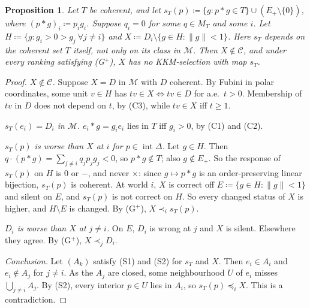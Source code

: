 \documentclass[11pt]{article}
\newcommand{\chg}[1]{{\color{red}#1}}
\newtheorem{proposition}[theorem]{Proposition}
\theoremstyle{definition}
\theoremstyle{remark}
\newcommand{\M}{\mathcal M}
\newcommand{\C}{\mathcal C}
\newcommand{\interior}{\operatorname{int}}
\newcommand{\conf}{\times}
\begin{document}
\begin{proposition}\label{prop:rescaled}
Let $T$ be coherent, and let $s_T(p)\coloneqq\{g:p\ast g\in T\}\cup(E_+\setminus\{0\})$, where $(p\ast g)_i\coloneqq p_ig_i$. Suppose $q_i=0$ for some $q\in M_T$ and some $i$. Let $H\coloneqq\{g:g_i>0>g_j\ \forall j\neq i\}$ and $X\coloneqq D_i\setminus\{g\in H:\|g\|<1\}$. \chg{Here $s_T$ depends on the coherent set $T$ itself, not only on its class in $\M$.} Then $X\notin\C$, and under every ranking satisfying (G$^+$), $X$ has no KKM-selection with map $s_T$.
\end{proposition}
\begin{proof}
\emph{$X\notin\C$.} Suppose $X=D$ in $\M$ with $D$ coherent. By Fubini in polar coordinates, some unit $v\in H$ has $tv\in X\Leftrightarrow tv\in D$ for a.e.\ $t>0$. Membership of $tv$ in $D$ does not depend on $t$, by (C3), while $tv\in X$ iff $t\ge1$.

\emph{$s_T(e_i)=D_i$ in $\M$.} $e_i\ast g=g_ie_i$ lies in $T$ iff $g_i>0$, by (C1) and (C2).

\emph{$s_T(p)$ is worse than $X$ at $i$ for $p\in\interior\Delta$.} Let $g\in H$. Then $q\cdot(p\ast g)=\sum_{j\neq i}q_jp_jg_j<0$, so $p\ast g\notin T$; also $g\notin E_+$. So the response of $s_T(p)$ on $H$ is $0$ or $-$, and never $\conf$: since $g\mapsto p\ast g$ is an order-preserving linear bijection, $s_T(p)$ is coherent. At world $i$, $X$ is correct off $E\coloneqq\{g\in H:\|g\|<1\}$ and silent on $E$, and $s_T(p)$ is not correct on $H$. So every changed status of $X$ is higher, and $H\setminus E$ is changed. By (G$^+$), $X\prec_is_T(p)$.

\emph{$D_i$ is worse than $X$ at $j\neq i$.} On $E$, $D_i$ is wrong at $j$ and $X$ is silent. Elsewhere they agree. By (G$^+$), $X\prec_jD_i$.

\emph{Conclusion.} Let $(A_k)$ satisfy (S1) and (S2) for $s_T$ and $X$. Then $e_i\in A_i$ and $e_i\notin A_j$ for $j\neq i$. As the $A_j$ are closed, some neighbourhood $U$ of $e_i$ misses $\bigcup_{j\neq i}A_j$. By (S2), every interior $p\in U$ lies in $A_i$, so $s_T(p)\preceq_iX$. This is a contradiction.
\end{proof}



\end{document}
